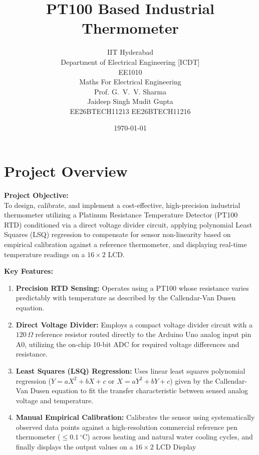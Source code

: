 \documentclass[journal,12pt,onecolumn]{IEEEtran}
\title{PT100 Based Industrial Thermometer} \vspace{0.3cm}
\author{IIT Hyderabad \\ \vspace{0.1cm}
	Department of Electrical Engineering [ICDT] \\ 
	\vspace{0.55cm}EE1010     \\ Maths For Electrical Engineering \\ \vspace{0.15cm} Prof. G.~V.~V. Sharma \\\vspace{0.8cm}
	Jaideep Singh \hspace{4.3cm}  Mudit Gupta\\ EE26BTECH11213 \hspace{2.8cm} EE26BTECH11216 \\\vspace{0.2cm} }
\date{\today}
\begin{document}
	\maketitle

	\section{Project Overview}
	\noindent \textbf{Project Objective:} \\
	To design, calibrate, and implement a cost-effective, high-precision industrial thermometer utilizing a Platinum Resistance Temperature Detector (PT100 RTD) conditioned via a direct voltage divider circuit, applying polynomial Least Squares (LSQ) regression to compensate for sensor non-linearity based on empirical calibration against a reference thermometer, and displaying real-time temperature readings on a $16\times2$ LCD.

	\vspace{0.3cm}
	\noindent \textbf{Key Features:}
	\begin{enumerate}
		\item \textbf{Precision RTD Sensing:} Operates using a PT100 whose resistance varies predictably with temperature as described by the Callendar-Van Dusen equation.
		\item \textbf{Direct Voltage Divider:} Employs a compact voltage divider circuit with a $120\,\Omega$ reference resistor routed directly to the Arduino Uno analog input pin A0, utilizing the on-chip 10-bit ADC for required voltage differences and resistance.
		\item \textbf{Least Squares (LSQ) Regression:} Uses linear least squares polynomial regression ($Y = aX^2 + bX + c$ or $X = aY^2 + bY + c$) given by the Callendar-Van Dusen equation to fit the transfer characteristic between sensed analog voltage and temperature.
		\item \textbf{Manual Empirical Calibration:} Calibrates the sensor using systematically observed data points against a high-resolution commercial reference pen thermometer ($\le 0.1\,^\circ\text{C}$) across heating and natural water cooling cycles, and finally displays the output values on a $16\times2$ LCD Display
	\end{enumerate}
\end{document}
